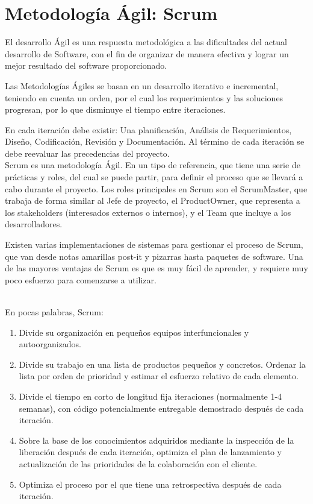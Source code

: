 \section{Metodolog\'{i}a \'{A}gil: Scrum}


El desarrollo \'{A}gil es una respuesta metodol\'{o}gica a las dificultades del actual desarrollo de Software, con el fin de organizar de manera efectiva y lograr un mejor resultado del software proporcionado.

Las Metodolog\'{i}as \'{A}giles se basan en un desarrollo iterativo e incremental, teniendo en cuenta un orden, por el cual los requerimientos y las soluciones progresan, por lo que disminuye el tiempo entre iteraciones.

En cada iteraci\'{o}n debe existir: Una planificaci\'{o}n, An\'{a}lisis de Requerimientos, Dise\~{n}o, Codificaci\'{o}n, Revisi\'{o}n y Documentaci\'{o}n. Al t\'{e}rmino de cada iteraci\'{o}n se debe reevaluar las precedencias del proyecto.\\

Scrum es una metodolog\'{i}a \'{A}gil. En un tipo de referencia, que tiene una serie de pr\'{a}cticas y roles, del cual se puede partir, para definir el proceso que se llevar\'{a} a cabo durante el proyecto. Los roles principales en Scrum son el ScrumMaster, que trabaja de forma similar al Jefe de proyecto, el ProductOwner, que representa a los stakeholders (interesados externos o internos), y el Team que incluye a los desarrolladores. 

Existen varias implementaciones de sistemas para gestionar el proceso de Scrum, que van desde notas amarillas post-it y pizarras hasta paquetes de software.
Una de las mayores ventajas de Scrum es que es muy f\'{a}cil de aprender, y requiere muy poco esfuerzo para comenzarse a utilizar.\\\

En pocas palabras, Scrum:

\begin{enumerate}
\item Divide su organizaci\'{o}n en peque\~{n}os equipos interfuncionales y autoorganizados.

\item Divide su trabajo en una lista de productos peque\~{n}os y concretos. Ordenar la lista por orden de prioridad y estimar el esfuerzo relativo de cada elemento.

\item Divide el tiempo en corto de longitud fija iteraciones (normalmente 1-4 semanas), con c\'{o}digo potencialmente entregable demostrado despu\'{e}s de cada iteraci\'{o}n.

\item Sobre la base de los conocimientos adquiridos mediante la inspecci\'{o}n de la liberaci\'{o}n despu\'{e}s de cada iteraci\'{o}n, optimiza el plan de lanzamiento y actualizaci\'{o}n de las prioridades de la colaboraci\'{o}n con el cliente.

\item Optimiza el proceso por el que tiene una retrospectiva despu\'{e}s de cada iteraci\'{o}n.
\end{enumerate}
